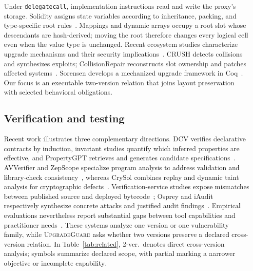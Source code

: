 \documentclass[runningheads]{llncs}
\newcommand{\tool}{\textsc{UpgradeGuard}\xspace}
\begin{document}
Under \texttt{delegatecall}, implementation instructions read and write the proxy's storage.  Solidity assigns state variables according to inheritance, packing, and type-specific root rules~\cite{solidity2025layout}.  Mappings and dynamic arrays occupy a root slot whose descendants are hash-derived; moving the root therefore changes every logical cell even when the value type is unchanged.  Recent ecosystem studies characterize upgrade mechanisms and their security implications~\cite{li2024characterizing,zhang2025proxy}. CRUSH detects collisions and synthesizes exploits; CollisionRepair reconstructs slot ownership and patches affected systems~\cite{ruaro2024crush,pan2025collisionrepair}. Sorensen develops a mechanized upgrade framework in Coq~\cite{sorensen2024upgrades}.  Our focus is an executable two-version relation that joins layout preservation with selected behavioral obligations.

\subsection{Verification and testing}

Recent work illustrates three complementary directions.  DCV verifies declarative contracts by induction, invariant studies quantify which inferred properties are effective, and PropertyGPT retrieves and generates candidate specifications~\cite{chen2024dcv,chen2024invariants,liu2025propertygpt}. AVVerifier and ZepScope specialize program analysis to address validation and library-check consistency~\cite{sun2024avverifier,liu2024zepscope}, whereas CrySol combines replay and dynamic taint analysis for cryptographic defects~\cite{zhang2025crysol}.  Verification-service studies expose mismatches between published source and deployed bytecode~\cite{ma2024verification}; Osprey and iAudit respectively synthesize concrete attacks and justified audit findings~\cite{ruaro2025osprey,ma2025iaudit}.  Empirical evaluations nevertheless report substantial gaps between tool capabilities and practitioner needs~\cite{chaliasos2024tools,li2024sast}.  These systems analyze one version or one vulnerability family, while \tool asks whether two versions preserve a declared cross-version relation. In Table~\ref{tab:related}, 2-ver.\ denotes direct cross-version analysis; symbols summarize declared scope, with partial marking a narrower objective or incomplete capability.
\end{document}
